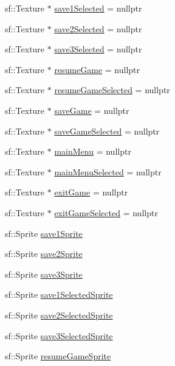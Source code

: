 \begin{DoxyCompactItemize}
sf\+::\+Texture $\ast$ \hyperlink{classTestApp_a8343e6dcd4cac0e324256f233083fefe}{save1\+Selected} = nullptr
\item 
sf\+::\+Texture $\ast$ \hyperlink{classTestApp_a5cf1b4015d8154c7a9a10dc8d3880583}{save2\+Selected} = nullptr
\item 
sf\+::\+Texture $\ast$ \hyperlink{classTestApp_a702c8feb51bdbd01137415eda97b11b1}{save3\+Selected} = nullptr
\item 
sf\+::\+Texture $\ast$ \hyperlink{classTestApp_a84f09383791a4d24088e5fe4b4cd6542}{resume\+Game} = nullptr
\item 
sf\+::\+Texture $\ast$ \hyperlink{classTestApp_a8caa47ef20c8711b1b89c9b82ab1202e}{resume\+Game\+Selected} = nullptr
\item 
sf\+::\+Texture $\ast$ \hyperlink{classTestApp_ae1bdaf3470ac78c1df4907259b65c704}{save\+Game} = nullptr
\item 
sf\+::\+Texture $\ast$ \hyperlink{classTestApp_a26f64bc9c07efe6d1be394e42a2bcc65}{save\+Game\+Selected} = nullptr
\item 
sf\+::\+Texture $\ast$ \hyperlink{classTestApp_a8311b4b23d548074865fbcaed3acba40}{main\+Menu} = nullptr
\item 
sf\+::\+Texture $\ast$ \hyperlink{classTestApp_ad6f809036a4aaf082211873d289b9f24}{main\+Menu\+Selected} = nullptr
\item 
sf\+::\+Texture $\ast$ \hyperlink{classTestApp_a25b19c66cacf4e14e625255dd7cd9a4a}{exit\+Game} = nullptr
\item 
sf\+::\+Texture $\ast$ \hyperlink{classTestApp_af8930e73e7b870f9ea39b80a8866bc15}{exit\+Game\+Selected} = nullptr
\item 
sf\+::\+Sprite \hyperlink{classTestApp_a1d85fde65bc3295c4c57c25d33443110}{save1\+Sprite}
\item 
sf\+::\+Sprite \hyperlink{classTestApp_ac6cd1deedf91c5eb334c7581e6097db9}{save2\+Sprite}
\item 
sf\+::\+Sprite \hyperlink{classTestApp_ade14eb2632645674f9c699fe0ede8e56}{save3\+Sprite}
\item 
sf\+::\+Sprite \hyperlink{classTestApp_ab1a8df80e966426fff373616793957aa}{save1\+Selected\+Sprite}
\item 
sf\+::\+Sprite \hyperlink{classTestApp_a032687def201e3842bbfc93cc5c0756b}{save2\+Selected\+Sprite}
\item 
sf\+::\+Sprite \hyperlink{classTestApp_ac1b6f39fe33e9eeca2167ab0127de161}{save3\+Selected\+Sprite}
\item 
sf\+::\+Sprite \hyperlink{classTestApp_a9d080e34bbede4ba5e6c6423ef34fd91}{resume\+Game\+Sprite}

\end{DoxyCompactItemize}
